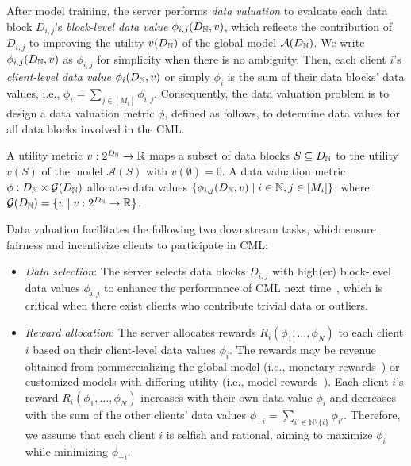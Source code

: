 After model training, the server performs \textit{data valuation} to evaluate each data block $D_{i,j}$'s \textit{block-level data value} $\phi_{i,j}(D_{\mathbb{N}}, v)$, which reflects the contribution of $D_{i,j}$ to improving the utility $v(D_{\mathbb{N}})$ of the global model $\mathcal{A}(D_{\mathbb{N}})$.
We write $\phi_{i,j}(D_{\mathbb{N}}, v)$ as $\phi_{i,j}$ for simplicity when there is no ambiguity.
Then, each client $i$'s \textit{client-level data value} $\phi_i(D_{\mathbb{N}}, v)$ or simply $\phi_i$ is the sum of their data blocks' data values, i.e., $\phi_i = \sum_{j\in[M_i]} \phi_{i,j}$. 
Consequently, the data valuation problem is to design a data valuation metric $\phi$, defined as follows, to determine data values for all data blocks involved in the CML.
\begin{definition}
    A utility metric $v: 2^{D_{\mathbb{N}}}\rightarrow \mathbb{R}$ maps a subset of data blocks $S \subseteq D_{\mathbb{N}}$ to the utility $v(S)$ of the model $\mathcal{A}(S)$ with $v(\emptyset) = 0$. 
    A data valuation metric $\phi: D_{\mathbb{N}} \times \mathcal{G}(D_{\mathbb{N}})$ allocates data values $\{\phi_{i,j}(D_{\mathbb{N}}, v) \mid i\in \mathbb{N}, j\in [M_i]\}$, where $\mathcal{G}(D_{\mathbb{N}}) = \{v\mid v:2^{D_{\mathbb{N}}} \rightarrow \mathbb{R}\}$.
\end{definition}

Data valuation facilitates the following two downstream tasks, which ensure fairness and incentivize clients to participate in CML:
\begin{itemize}[leftmargin=*]
    \item \textit{Data selection}: The server selects data blocks $D_{i,j}$ with high(er) block-level data values $\phi_{i,j}$ to enhance the performance of CML next time~\citep{cohen2005feature, nagalapatti2021game}, which is critical when there exist clients who contribute trivial data or outliers.
    \item \textit{Reward allocation}: The server allocates rewards $R_i(\phi_1,\dots,\phi_N)$ to each client $i$ based on their client-level data values $\phi_i$.
    The rewards may be revenue obtained from commercializing the global model (i.e., monetary rewards~\citep{nguyen2022trade}) or customized models with differing utility (i.e., model rewards~\citep{sim2020collaborative}).
    Each client $i$'s reward $R_i(\phi_1,\dots,\phi_N)$ increases with their own data value $\phi_i$ and decreases with the sum of the other clients' data values $\phi_{-i} = \sum_{i'\in \mathbb{N} \setminus \{i\}} \phi_{i'}$. 
    Therefore, we assume that each client $i$ is selfish and rational, aiming to maximize $\phi_i$ while minimizing $\phi_{-i}$.
\end{itemize}


